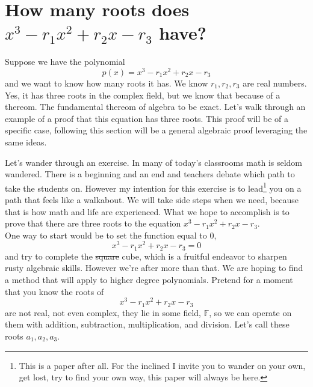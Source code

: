 \documentclass[12pt]{article}
\begin{document}




\section*{How many roots does $x^3 -r_1 x^2 +r_2 x - r_3$ have?}
Suppose we have the polynomial $$p(x) = x^3 -r_1 x^2 +r_2 x - r_3$$ and we want to know how many roots it has.  We know $r_1, r_2, r_3$ are real numbers.  Yes, it has three roots in the complex field, but we know that because of a thereom.  The fundamental thereom of algebra to be exact.  Let's walk through an example of a proof that this equation has three roots.  This proof will be of a specific case, following this section will be a general algebraic proof leveraging the same ideas.  

Let's wander through an exercise.  In many of today's classrooms math is seldom wandered.  There is a beginning and an end and teachers debate which path to take the students on.  However my intention for this exercise is to lead\footnote{This is a paper after all.  For the inclined I invite you to wander on your own, get lost, try to find your own way, this paper will always be here.} you on a path that feels like a walkabout.  We will take side steps when we need, because that is how math and life are experienced.  What we hope to accomplish is to prove that there are three roots to the equation $x^3 -r_1 x^2 +r_2 x - r_3$.\\

One way to start would be to set the function equal to 0,  $$x^3 -r_1 x^2 +r_2 x - r_3 =0$$ and try to complete the \sout{square} cube,  which is a fruitful endeavor to sharpen rusty algebraic skills.  However we're after more than that.  We are hoping to find a method that will apply to higher degree polynomials.  Pretend for a moment that you know the roots of  $$x^3 -r_1 x^2 +r_2 x - r_3$$ are not real, not even complex, they lie in some field, $\mathbb{F}$, so we can operate on them with addition, subtraction, multiplication, and division.  Let's call these roots $a_1, a_2, a_3$.  
\end{document}
